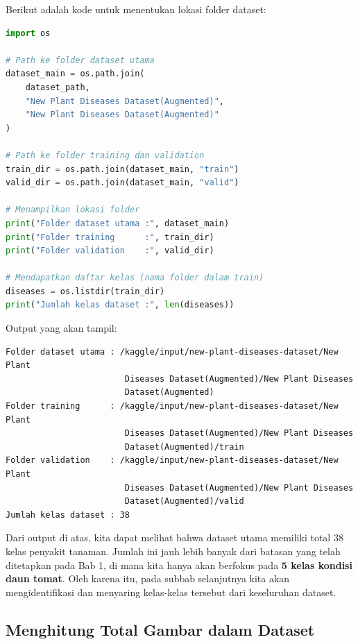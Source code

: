 Berikut adalah kode untuk menentukan lokasi folder dataset:

\begin{lstlisting}[language=Python, caption=Menentukan lokasi folder dataset]
import os

# Path ke folder dataset utama
dataset_main = os.path.join(
    dataset_path,
    "New Plant Diseases Dataset(Augmented)",
    "New Plant Diseases Dataset(Augmented)"
)

# Path ke folder training dan validation
train_dir = os.path.join(dataset_main, "train")
valid_dir = os.path.join(dataset_main, "valid")

# Menampilkan lokasi folder
print("Folder dataset utama :", dataset_main)
print("Folder training      :", train_dir)
print("Folder validation    :", valid_dir)

# Mendapatkan daftar kelas (nama folder dalam train)
diseases = os.listdir(train_dir)
print("Jumlah kelas dataset :", len(diseases))
\end{lstlisting}

Output yang akan tampil:

\begin{outputcode}[H]
\begin{lstlisting}[language={}]
Folder dataset utama : /kaggle/input/new-plant-diseases-dataset/New Plant
                        Diseases Dataset(Augmented)/New Plant Diseases
                        Dataset(Augmented)
Folder training      : /kaggle/input/new-plant-diseases-dataset/New Plant
                        Diseases Dataset(Augmented)/New Plant Diseases
                        Dataset(Augmented)/train
Folder validation    : /kaggle/input/new-plant-diseases-dataset/New Plant
                        Diseases Dataset(Augmented)/New Plant Diseases
                        Dataset(Augmented)/valid
Jumlah kelas dataset : 38
\end{lstlisting}
\caption{Output lokasi folder dataset}
\end{outputcode}

Dari output di atas, kita dapat melihat bahwa dataset utama memiliki total 38 kelas penyakit tanaman. Jumlah ini jauh lebih banyak dari batasan yang telah ditetapkan pada Bab 1, di mana kita hanya akan berfokus pada \textbf{5 kelas kondisi daun tomat}. Oleh karena itu, pada subbab selanjutnya kita akan mengidentifikasi dan menyaring kelas-kelas tersebut dari keseluruhan dataset.

\subsection{Menghitung Total Gambar dalam Dataset}

